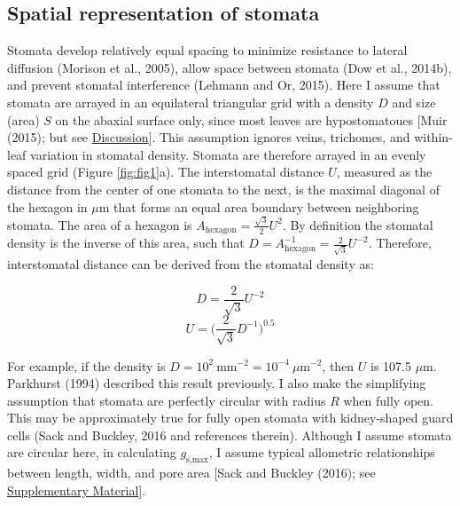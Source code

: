 \documentclass[utf8]{frontiersSCNS}
\newcommand{\gsmax}{$g_\text{s,max}$}
\begin{document}
\hypertarget{spatial-representation-of-stomata}{%
\subsection*{Spatial representation of
stomata}\label{spatial-representation-of-stomata}}

Stomata develop relatively equal spacing to minimize resistance to
lateral diffusion (Morison et al., 2005), allow space between stomata
(Dow et al., 2014b), and prevent stomatal interference (Lehmann and Or,
2015). Here I assume that stomata are arrayed in an equilateral
triangular grid with a density \(D\) and size (area) \(S\) on the
abaxial surface only, since most leaves are hypostomatoues {[}Muir
(2015); but see \protect\hyperlink{discussion}{Discussion}{]}. This
assumption ignores veins, trichomes, and within-leaf variation in
stomatal density. Stomata are therefore arrayed in an evenly spaced grid
(Figure \ref{fig:fig1}a). The interstomatal distance \(U\), measured as
the distance from the center of one stomata to the next, is the maximal
diagonal of the hexagon in \(\mu\textrm{m}\) that forms an equal area
boundary between neighboring stomata. The area of a hexagon is
\(A_\textrm{hexagon} = \frac{\sqrt{3}}{2} U ^ 2\). By definition the
stomatal density is the inverse of this area, such that
\(D = A^{-1}_\textrm{hexagon} = \frac{2}{\sqrt{3}} U ^ {-2}\).
Therefore, interstomatal distance can be derived from the stomatal
density as:

\[ D = \frac{2}{\sqrt{3}} U ^{-2} \]
\[ U = \bigg(\frac{2}{\sqrt{3}} D ^{-1}\bigg) ^ {0.5} \]

For example, if the density is
\(D = 10 ^ 2~\textrm{mm}^{-2} = 10 ^ {-4}~\mu\textrm{m}^{-2}\), then
\(U\) is 107.5 \(\mu \textrm{m}\). Parkhurst (1994) described this
result previously. I also make the simplifying assumption that stomata
are perfectly circular with radius \(R\) when fully open. This may be
approximately true for fully open stomata with kidney-shaped guard cells
(Sack and Buckley, 2016 and references therein). Although I assume
stomata are circular here, in calculating \gsmax, I assume typical
allometric relationships between length, width, and pore area {[}Sack
and Buckley (2016); see
\protect\hyperlink{supplementary-material}{Supplementary Material}{]}.
\end{document}
